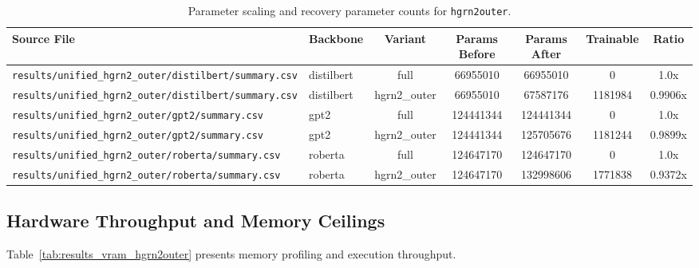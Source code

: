 \begin{table}[t]
\centering
\small
\begin{tabular}{llccccc}
\toprule
\textbf{Source File} & \textbf{Backbone} & \textbf{Variant} & \textbf{Params Before} & \textbf{Params After} & \textbf{Trainable} & \textbf{Ratio} \\
\midrule
\texttt{results/unified\_hgrn2\_outer/distilbert/summary.csv} & distilbert & full & 66955010 & 66955010 & 0 & 1.0x \\
\texttt{results/unified\_hgrn2\_outer/distilbert/summary.csv} & distilbert & hgrn2\_outer & 66955010 & 67587176 & 1181984 & 0.9906x \\
\texttt{results/unified\_hgrn2\_outer/gpt2/summary.csv} & gpt2 & full & 124441344 & 124441344 & 0 & 1.0x \\
\texttt{results/unified\_hgrn2\_outer/gpt2/summary.csv} & gpt2 & hgrn2\_outer & 124441344 & 125705676 & 1181244 & 0.9899x \\
\texttt{results/unified\_hgrn2\_outer/roberta/summary.csv} & roberta & full & 124647170 & 124647170 & 0 & 1.0x \\
\texttt{results/unified\_hgrn2\_outer/roberta/summary.csv} & roberta & hgrn2\_outer & 124647170 & 132998606 & 1771838 & 0.9372x \\
\bottomrule
\end{tabular}
\caption{Parameter scaling and recovery parameter counts for \texttt{hgrn2outer}.}
\label{tab:results_params_hgrn2outer}
\end{table}

\subsection{Hardware Throughput and Memory Ceilings}
Table~\ref{tab:results_vram_hgrn2outer} presents memory profiling and execution throughput.

